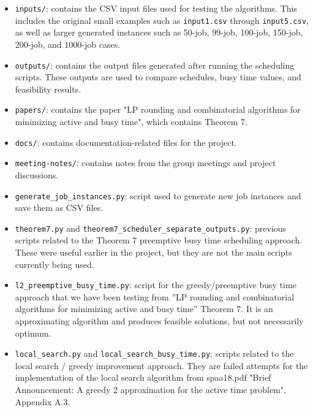 \documentclass[12pt]{article}
\begin{document}
\begin{itemize}
    \item \texttt{inputs/}: contains the CSV input files used for testing the
    algorithms. This includes the original small examples such as
    \texttt{input1.csv} through \texttt{input5.csv}, as well as larger generated
    instances such as 50-job, 99-job, 100-job, 150-job, 200-job, and 1000-job
    cases.

    \item \texttt{outputs/}: contains the output files generated after running
    the scheduling scripts. These outputs are used to compare schedules, busy
    time values, and feasibility results.

    \item \texttt{papers/}: contains the paper "LP rounding and combinatorial algorithms for minimizing active and busy time", which contains Theorem 7.

    \item \texttt{docs/}: contains documentation-related files for the project.

    \item \texttt{meeting-notes/}: contains notes from the group meetings and
    project discussions.

    \item \texttt{generate\_job\_instances.py}: script used to generate new job
    instances and save them as CSV files.

    \item \texttt{theorem7.py} and
    \texttt{theorem7\_scheduler\_separate\_outputs.py}: previous scripts related
    to the Theorem 7 preemptive busy time scheduling approach. These were useful
    earlier in the project, but they are not the main scripts currently being
    used.

    \item \texttt{l2\_preemptive\_busy\_time.py}: script for the greedy/preemptive
    busy time approach that we have been testing from ”LP rounding and combinatorial algorithms for minimizing active and busy time” Theorem 7. It is an approximating algorithm and produces feasible solutions, but not necessarily optimum.

    \item \texttt{local\_search.py} and \texttt{local\_search\_busy\_time.py}:
    scripts related to the local search / greedy improvement approach. They are failed attempts for the implementation of the local search algorithm from spaa18.pdf "Brief Announcement: A greedy 2 approximation for the active time problem", Appendix A.3.


\end{itemize}
\end{document}
